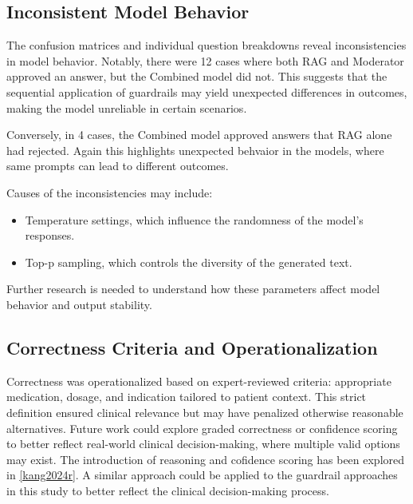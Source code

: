 \subsection{Inconsistent Model Behavior}
The confusion matrices and individual question breakdowns reveal inconsistencies in model behavior.
Notably, there were 12 cases where both RAG and Moderator approved an answer, but the Combined model did not.
This suggests that the sequential application of guardrails may yield unexpected differences in outcomes, making the model unreliable in certain scenarios.

Conversely, in 4 cases, the Combined model approved answers that RAG alone had rejected.
Again this highlights unexpected behvaior in the models, where same prompts can lead to different outcomes.

Causes of the inconsistencies may include:
\begin{itemize}
    \item Temperature settings, which influence the randomness of the model's responses.
    \item Top-p sampling, which controls the diversity of the generated text.
\end{itemize}
Further research is needed to understand how these parameters affect model behavior and output stability.

\subsection{Correctness Criteria and Operationalization}
Correctness was operationalized based on expert-reviewed criteria: appropriate medication, dosage, and indication tailored to patient context.
This strict definition ensured clinical relevance but may have penalized otherwise reasonable alternatives.
Future work could explore graded correctness or confidence scoring to better reflect real-world clinical decision-making, where multiple valid options may exist.
The introduction of reasoning and cofidence scoring has been explored in \autoref{kang2024r}.
A similar approach could be applied to the guardrail approaches in this study to better reflect the clinical decision-making process.

